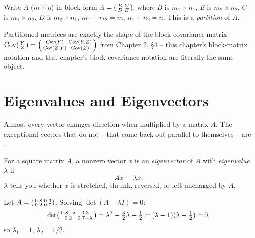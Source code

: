 \documentclass[11pt]{article}
\begin{document}
\begin{definition}
Write $A$ ($m\times n$) in block form
$A = \begin{psmallmatrix} B & C \\ D & E \end{psmallmatrix}$,
where $B$ is $m_1\times n_1$, $E$ is $m_2\times n_2$, $C$ is $m_1\times
n_2$, $D$ is $m_2\times n_1$, $m_1+m_2=m$, $n_1+n_2=n$. This is a
\emph{partition} of $A$.
\end{definition}

Partitioned matrices are exactly the shape of the block covariance matrix
$\mathrm{Cov}\begin{psmallmatrix}Y\\Z\end{psmallmatrix} =
\begin{psmallmatrix}\mathrm{Cov}(Y) & \mathrm{Cov}(Y,Z) \\
\mathrm{Cov}(Z,Y) & \mathrm{Cov}(Z)\end{psmallmatrix}$ from Chapter 2,
\S4 -- this chapter's block-matrix notation and that chapter's block
covariance notation are literally the same object.

\section{Eigenvalues and Eigenvectors}

Almost every vector changes direction when multiplied by a matrix $A$.
The exceptional vectors that do not -- that come back out parallel to
themselves -- are .

\begin{definition}
For a square matrix $A$, a nonzero vector $x$ is an \emph{eigenvector} of
$A$ with \emph{eigenvalue} $\lambda$ if
\[
  Ax = \lambda x.
\]
$\lambda$ tells you whether $x$ is stretched, shrunk, reversed, or left
unchanged by $A$.
\end{definition}

\begin{example}
Let $A = \begin{psmallmatrix}0.8 & 0.3 \\ 0.2 & 0.7\end{psmallmatrix}$.
Solving $\det(A - \lambda I) = 0$:
\[
  \det\begin{psmallmatrix}0.8-\lambda & 0.3 \\ 0.2 & 0.7-\lambda
  \end{psmallmatrix} = \lambda^2 - \tfrac{3}{2}\lambda + \tfrac{1}{2}
  = (\lambda - 1)(\lambda - \tfrac{1}{2}) = 0,
\]
so $\lambda_1 = 1$, $\lambda_2 = 1/2$.
\end{example}
\end{document}
